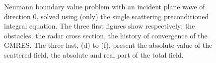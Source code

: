 \begin{figure}
\caption{Neumann boundary value problem with an incident plane wave of direction $0$, solved using (only) the single scattering preconditioned integral equation. The three first figures show respectively: the obstacles, the radar cross section, the history of convergence of the GMRES. The three last, (d) to (f), present the absolute value of the scattered field, the absolute and real part of the total field.}
\label{fig:exampleNeumann}
\end{figure}


